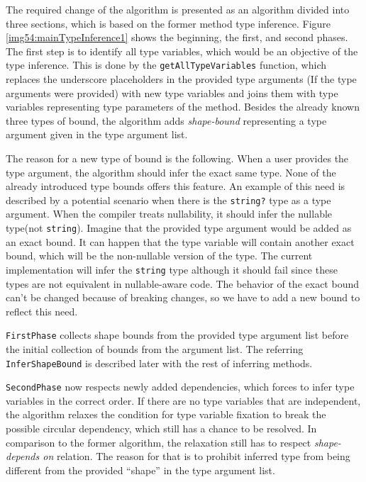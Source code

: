 The required change of the algorithm is presented as an algorithm divided into three sections, which is based on the former method type inference. 
Figure \ref{img54:mainTypeInference1} shows the beginning, the first, and second phases. 
The first step is to identify all type variables, which would be an objective of the type inference. 
This is done by the \texttt{getAllTypeVariables} function, which replaces the underscore placeholders in the provided type arguments (If the type arguments were provided) with new type variables and joins them with type variables representing type parameters of
the method.
Besides the already known three types of bound, the algorithm adds \textit{shape-bound} representing a type argument given in the type argument list.
\par
The reason for a new type of bound is the following. 
When a user provides the type argument, the algorithm should infer the exact same type. 
None of the already introduced type bounds offers this feature. 
An example of this need is described by a potential scenario when there is the \texttt{string?} type as a type argument. 
When the compiler treats nullability, it should infer the nullable type(not \texttt{string}). 
Imagine that the provided type argument would be added as an exact bound.
It can happen that the type variable will contain another exact bound, which will be the non-nullable version of the type.
The current implementation will infer the \texttt{string} type although it should fail since these types are not equivalent in nullable-aware code.
The behavior of the exact bound can’t be changed because of breaking changes, so we have to add a new bound to reflect this need.
\par
\texttt{FirstPhase} collects shape bounds from the provided type argument list before the initial  collection of bounds from the argument list.
The referring\\ \texttt{InferShapeBound} is described later with the rest of inferring methods.
\par
\texttt{SecondPhase} now respects newly added dependencies, which forces to infer type variables in the correct order. 
If there are no type variables that are independent, the algorithm relaxes the condition for type variable fixation to break the possible circular dependency, which still has a chance to be resolved. 
In comparison to the former algorithm, the relaxation still has to respect \textit{shape-depends on} relation. 
The reason for that is to prohibit inferred type from being different from the provided ``shape'' in the type argument list. 
